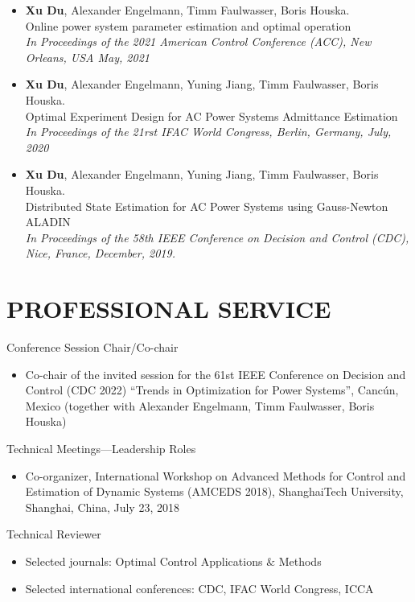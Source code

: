\documentclass[paper=a4,fontsize=11pt]{scrartcl} %
\newcommand{\NewPart}[1]{\section*{\uppercase{#1}}}
\newcommand{\EducationEntry}[4]{
	\noindent \textbf{#1} \hfill      %
	\colorbox{White}{%
		\parbox{5cm}{%
			\hfill\color{Black}#2}} \par  %
	\noindent \textit{#3} \par        %
	\noindent\hangindent=2em\hangafter=0 \small #4 %
	\normalsize \par}
\begin{document}
\begin{itemize}
			\item  { \textbf{Xu Du}, Alexander Engelmann, Timm Faulwasser, Boris Houska. \\
				{Online power system parameter estimation and optimal operation}\\
				\emph{In Proceedings of the 2021 American Control Conference (ACC), New Orleans, USA May, 2021
			} }
			
			\item  {\textbf{Xu Du}, Alexander Engelmann, Yuning Jiang, Timm Faulwasser, Boris Houska. \\
				Optimal Experiment Design for AC Power Systems Admittance Estimation\\
				\emph{In Proceedings of the 21rst IFAC World Congress, Berlin, Germany, July, 2020
			} }
			
			\item  {\textbf{Xu Du}, Alexander Engelmann, Yuning Jiang, Timm Faulwasser, Boris Houska. \\
				Distributed State Estimation for AC Power Systems using Gauss-Newton ALADIN \\
				\emph{In Proceedings of the 58th IEEE Conference on Decision and Control (CDC),
					Nice, France, December, 2019.} }
		\end{itemize}
		
		\NewPart{Professional Service}{Conference Session Chair/Co-chair}
			\begin{itemize}
				\item{Co-chair of the invited session for the 61st
					IEEE Conference on Decision and Control (CDC 2022)
					“Trends in Optimization for Power Systems”, Canc\'un, Mexico} (together with Alexander Engelmann, Timm Faulwasser, Boris Houska)
			\end{itemize}
			{Technical Meetings—Leadership Roles}
			\begin{itemize}
				\item{Co-organizer, International Workshop on Advanced Methods for Control and Estimation of Dynamic
					Systems (AMCEDS 2018), ShanghaiTech University, Shanghai, China, July 23, 2018}
			\end{itemize}
			{Technical Reviewer}
			\begin{itemize}
				\item Selected journals: Optimal Control Applications $\&$ Methods
				\item Selected international conferences: CDC, IFAC World Congress, ICCA
			\end{itemize}
			
\end{document}
